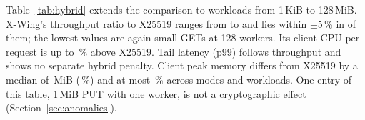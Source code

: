 \documentclass[review,12pt]{elsarticle}
\newcommand{\lab}[1]{\textsf{#1}}
\begin{document}
\begin{table}[!htbp]
\caption{Hybrid modes in the primary cells: paired throughput ratio and unadjusted TOST verdict at $\pm$5\,\% (exploratory). P3 = X-Wing, P2 = concatenation hybrid.}
\label{tab:secondary}
\centering\footnotesize
\setlength{\tabcolsep}{3pt}
\end{table}

Table~\ref{tab:hybrid} extends the comparison to \RevMatrixCells{} workloads
from 1\,KiB to 128\,MiB. X-Wing's throughput ratio to X25519 ranges from \RevMatrixXwingLo{} to
\RevMatrixXwingHi{} and lies within $\pm$5\,\% in \RevMatrixXwingWithin{} of them; the lowest
values are again small GETs at 128 workers. Its client CPU per request is up to
\RevMatrixXwingCpuHi\,\% above X25519. Tail latency (p99) follows throughput and shows no
separate hybrid penalty. Client peak memory differs from X25519 by a median of
\RevHybridRssDiffMedian\,MiB (\RevHybridRssDiffMedianPct\,\%) and at most
\RevHybridRssDiffMaxPct\,\% across modes and workloads. One entry of this table, 1\,MiB PUT with
one worker, is not a cryptographic effect (Section~\ref{sec:anomalies}).

\begin{table}[!htbp]
\caption{\lab{Hybrid-Matrix} (64\,KiB at 128 workers from \lab{Primary-x86}): X25519 in absolute terms and paired ratios of ML-KEM-768 (P1), the concatenation hybrid (P2) and X-Wing (P3) to it. $^{*}$ = the 95\,\% interval of the ratio excludes 1 (unadjusted, five runs; ten in \lab{Primary-x86}). Of the \RevMatrixTests{} ratios, \RevMatrixRawSig{} are marked; \RevMatrixFdrSig{} remain at a false-discovery rate of 5\,\% (Benjamini--Hochberg), so individual marks should not be over-read.}
\label{tab:hybrid}
\centering\footnotesize
\setlength{\tabcolsep}{4pt}
\end{table}
\end{document}
